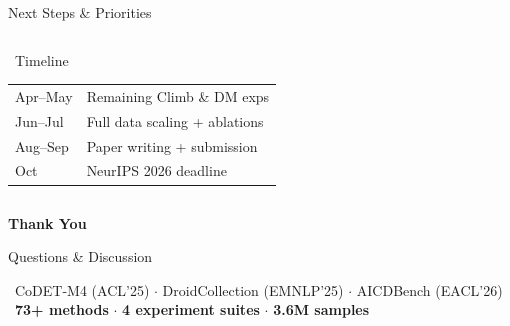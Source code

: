 \documentclass[aspectratio=169, 10pt]{beamer}
\begin{document}
\begin{frame}{Next Steps \& Priorities}
\begin{columns}[T]
\vspace{-0.1cm}
\begin{alertblock}{\faClock\ Timeline}
\scriptsize
\begin{tabular}{@{}ll@{}}
Apr--May & Remaining Climb \& DM exps \\
Jun--Jul & Full data scaling + ablations \\
Aug--Sep & Paper writing + submission \\
Oct & NeurIPS 2026 deadline \\
\end{tabular}
\end{alertblock}
\end{columns}
\end{frame}


\begin{frame}{}
\vspace{1.5cm}
\begin{center}
{\Huge \textbf{Thank You}}
\vspace{0.8cm}

{\Large Questions \& Discussion}
\vspace{1cm}

{\small
\faDatabase\ CoDET-M4 {\tiny(ACL'25)} $\cdot$ DroidCollection {\tiny(EMNLP'25)} $\cdot$ AICDBench {\tiny(EACL'26)} \\[4pt]
\faStar\ \textbf{73+ methods} $\cdot$ \textbf{4 experiment suites} $\cdot$ \textbf{3.6M samples}
}
\end{center}
\end{frame}
\end{document}
